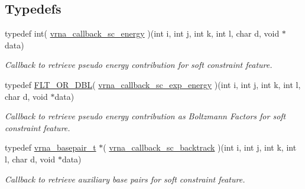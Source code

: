 \subsection*{Typedefs}
\begin{DoxyCompactItemize}
\item 
typedef int( \hyperlink{group__generalized__sc_ga2f3d2d2333e5a616e0f5cd4823780c0c}{vrna\-\_\-callback\-\_\-sc\-\_\-energy} )(int i, int j, int k, int l, char d, void $\ast$data)
\begin{DoxyCompactList}\small\item\em Callback to retrieve pseudo energy contribution for soft constraint feature. \end{DoxyCompactList}\item 
typedef \hyperlink{group__data__structures_ga31125aeace516926bf7f251f759b6126}{F\-L\-T\-\_\-\-O\-R\-\_\-\-D\-B\-L}( \hyperlink{group__generalized__sc_ga28d5138cc47eb7a5116c87518fd076a9}{vrna\-\_\-callback\-\_\-sc\-\_\-exp\-\_\-energy} )(int i, int j, int k, int l, char d, void $\ast$data)
\begin{DoxyCompactList}\small\item\em Callback to retrieve pseudo energy contribution as Boltzmann Factors for soft constraint feature. \end{DoxyCompactList}\item 
typedef \hyperlink{group__data__structures_gac8c5669d3fb813cacf506489689305ce}{vrna\-\_\-basepair\-\_\-t} $\ast$( \hyperlink{group__generalized__sc_ga1157aec50aa078464b868b5d2245ebf5}{vrna\-\_\-callback\-\_\-sc\-\_\-backtrack} )(int i, int j, int k, int l, char d, void $\ast$data)
\begin{DoxyCompactList}\small\item\em Callback to retrieve auxiliary base pairs for soft constraint feature. \end{DoxyCompactList}\end{DoxyCompactItemize}
